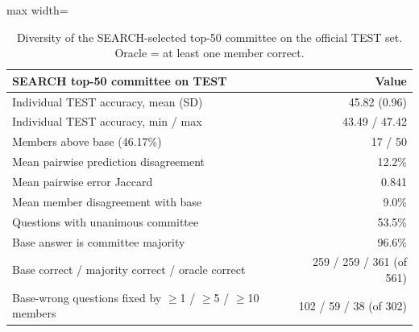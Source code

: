 \begin{table}[t]
\centering
\small
\begin{adjustbox}{max width=\linewidth}
\begin{tabular}{lr}
\toprule
SEARCH top-50 committee on TEST & Value \\
\midrule
Individual TEST accuracy, mean (SD) & 45.82 (0.96) \\
Individual TEST accuracy, min / max & 43.49 / 47.42 \\
Members above base (46.17\%) & 17 / 50 \\
Mean pairwise prediction disagreement & 12.2\% \\
Mean pairwise error Jaccard & 0.841 \\
Mean member disagreement with base & 9.0\% \\
Questions with unanimous committee & 53.5\% \\
Base answer is committee majority & 96.6\% \\
\midrule
Base correct / majority correct / oracle correct & 259 / 259 / 361 (of 561) \\
Base-wrong questions fixed by $\ge$1 / $\ge$5 / $\ge$10 members & 102 / 59 / 38 (of 302) \\
\bottomrule
\end{tabular}
\end{adjustbox}
\caption{Diversity of the SEARCH-selected top-50 committee on the official TEST set. Oracle = at least one member correct.}
\label{tab:committee}
\end{table}
